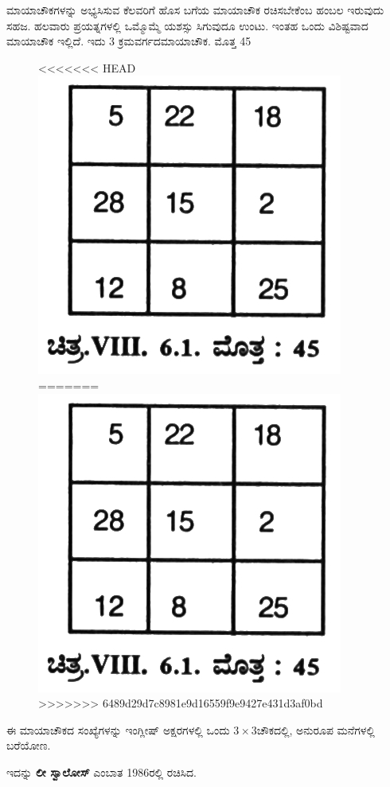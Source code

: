 ಮಾಯಾಚೌಕಗಳನ್ನು ಅಭ್ಯಸಿಸುವ ಕೆಲವರಿಗೆ ಹೊಸ ಬಗೆಯ ಮಾಯಾಚೌಕ ರಚಿಸಬೇಕೆಂಬ ಹಂಬಲ ಇರುವುದು ಸಹಜ. ಹಲವಾರು ಪ್ರಯತ್ನಗಳಲ್ಲಿ ಒಮ್ಮೊಮ್ಮೆ ಯಶಸ್ಸು ಸಿಗುವುದೂ ಉಂಟು. ಇಂತಹ ಒಂದು ವಿಶಿಷ್ಟವಾದ ಮಾಯಾಚೌಕ ಇಲ್ಲಿದೆ. ಇದು 3 ಕ್ರಮವರ್ಗದ\break ಮಾಯಾಚೌಕ. ಮೊತ್ತ 45
\begin{figure}[H]
<<<<<<< HEAD
\includegraphics{src/figures/chap7/fig7-21.jpg}
=======
\includegraphics[scale=0.8]{src/figures/chap7/fig7.21.jpg}
>>>>>>> 6489d29d7c8981e9d16559f9e9427e431d3af0bd
\end{figure}

ಈ ಮಾಯಾಚೌಕದ ಸಂಖ್ಯೆಗಳನ್ನು ಇಂಗ್ಲೀಷ್ ಅಕ್ಷರಗಳಲ್ಲಿ ಒಂದು $3 \times 3$ಚೌಕದಲ್ಲಿ, ಅನುರೂಪ ಮನೆಗಳಲ್ಲಿ ಬರೆಯೋಣ.

ಇದನ್ನು \textbf{ಲೀ ಸ್ವಾಲೋಸ್} ಎಂಬಾತ 1986ರಲ್ಲಿ ರಚಿಸಿದ.

